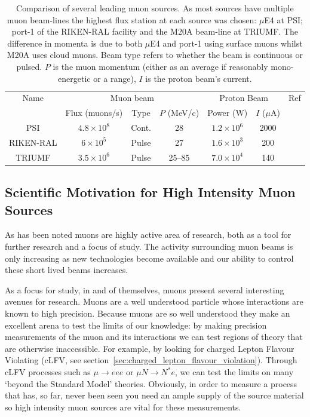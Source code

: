 \begin{table}[htpb]
  \begin{center}
  \begin{tabular}{c | c | c | c | c | c | c}
    Name       &  \multicolumn{3}{c|}{Muon beam}                 &  \multicolumn{2}{c|}{Proton Beam}  &   Ref \\
               &  Flux (muons/s)     &  Type  & \( P \) (MeV/c)  &  Power (W)    & \(I\) (\(\mu\)A)   &       \\
    \hline    
    PSI        &  \(4.8\times10^8\)  &  Cont.  &  28  &  \(1.2\times10^6\)  &  2000  &  \cite{mue4_psi}   \\ 
    RIKEN-RAL  &  \(6\times10^5\)    &  Pulse  &  27  &  \(1.6\times10^3\)  &  200   &  \cite{riken_ral}       \\
    TRIUMF     &  \(3.5\times10^6\)  &  Pulse  &  25--85  &  \(7.0\times10^4\)  &  140   &  \cite{triumf_m20a} \\
  \end{tabular}
  \end{center}
  \caption{Comparison of several leading muon sources. As most sources have multiple muon beam-lines the highest flux station at each source was chosen: \(\mu\)E4 at PSI; port-1 of the RIKEN-RAL facility and the M20A beam-line at TRIUMF. The difference in momenta is due to both \(\mu\)E4 and port-1 using surface muons whilst M20A uses cloud muons. Beam type refers to whether the beam is continuous or pulsed. \( P \) is the muon momentum (either as an average if reasonably mono-energetic or a range), \( I \) is the proton beam's current.}
  \label{tab:cf_muon_sources}
\end{table}


\subsection{Scientific Motivation for High Intensity Muon Sources} %
\label{sec:scientific_motivation_for_high_intenstity_muon_sources}
As has been noted muons are highly active area of research, both as a tool for further research and a focus of study. The activity surrounding muon beams is only increasing as new technologies become available and our ability to control these short lived beams increases. 

As a focus for study, in and of themselves, muons present several interesting avenues for research. Muons are a well understood particle whose interactions are known to high precision. Because muons are so well understood they make an excellent arena to test the limits of our knowledge: by making precision measurements of the muon and its interactions we can test regions of theory that are otherwise inaccessible. For example, by looking for charged Lepton Flavour Violating (cLFV, see section~\ref{sec:charged_lepton_flavour_violation}). Through cLFV processes such as \( \mu\rightarrow eee \) or \( \mu N \rightarrow N^* e \), we can test the limits on many `beyond the Standard Model' theories. Obviously, in order to measure a process that has, so far, never been seen you need an ample supply of the source material so high intensity muon sources are vital for these measurements.

